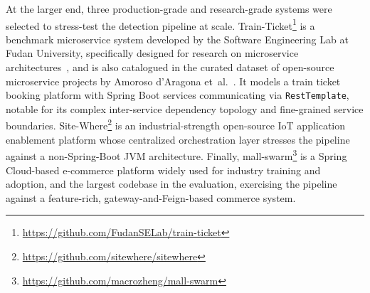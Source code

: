 \par At the larger end, three production-grade and research-grade systems were selected to stress-test the detection pipeline at scale. Train-Ticket\footnote{\url{https://github.com/FudanSELab/train-ticket}} is a benchmark microservice system developed by the Software Engineering Lab at Fudan University, specifically designed for research on microservice architectures~\cite{XZhou2018}, and is also catalogued in the curated dataset of open-source microservice projects by Amoroso d'Aragona et~al.~\cite{10.1145/3643991.3644890}. It models a train ticket booking platform with Spring Boot services communicating via \texttt{RestTemplate}, notable for its complex inter-service dependency topology and fine-grained service boundaries. Site-Where\footnote{\url{https://github.com/sitewhere/sitewhere}} is an industrial-strength open-source IoT application enablement platform whose centralized orchestration layer stresses the pipeline against a non-Spring-Boot JVM architecture. Finally, mall-swarm\footnote{\url{https://github.com/macrozheng/mall-swarm}} is a Spring Cloud-based e-commerce platform widely used for industry training and adoption, and the largest codebase in the evaluation, exercising the pipeline against a feature-rich, gateway-and-Feign-based commerce system.



